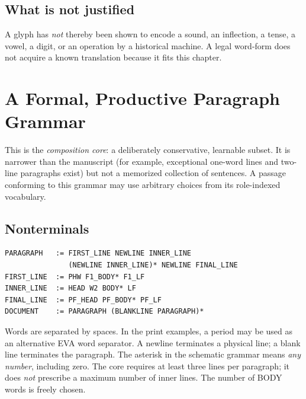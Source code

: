 \documentclass[11pt,a4paper]{article}
\begin{document}
\subsection{What is not justified}
A glyph has \emph{not} thereby been shown to encode a sound, an inflection, a tense, a vowel, a digit, or an operation by a historical machine. A legal word-form does not acquire a known translation because it fits this chapter.

\section{A Formal, Productive Paragraph Grammar}
This is the \emph{composition core}: a deliberately conservative, learnable subset. It is narrower than the manuscript (for example, exceptional one-word lines and two-line paragraphs exist) but not a memorized collection of sentences. A passage conforming to this grammar may use arbitrary choices from its role-indexed vocabulary.

\subsection{Nonterminals}
\begin{Verbatim}[fontsize=\small]
PARAGRAPH   := FIRST_LINE NEWLINE INNER_LINE
               (NEWLINE INNER_LINE)* NEWLINE FINAL_LINE
FIRST_LINE  := PHW F1_BODY* F1_LF
INNER_LINE  := HEAD W2 BODY* LF
FINAL_LINE  := PF_HEAD PF_BODY* PF_LF
DOCUMENT    := PARAGRAPH (BLANKLINE PARAGRAPH)*
\end{Verbatim}

Words are separated by spaces. In the print examples, a period may be used as an alternative EVA word separator. A newline terminates a physical line; a blank line terminates the paragraph. The asterisk in the schematic grammar means \emph{any number}, including zero. The core requires at least three lines per paragraph; it does \emph{not} prescribe a maximum number of inner lines. The number of BODY words is freely chosen.
\end{document}
